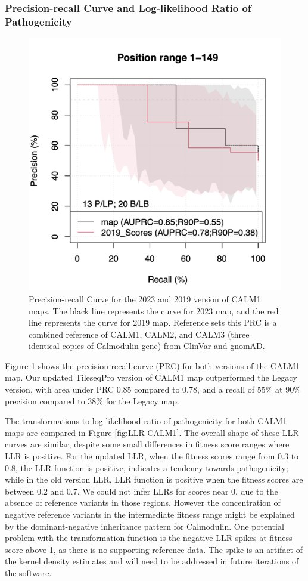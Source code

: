 \documentclass{article}
\begin{document}
\subsubsection{Precision-recall Curve and Log-likelihood Ratio of Pathogenicity}
\begin{figure}[H]
    \centering
    \includegraphics[width =.4\textwidth]{Figures/CALM1/update_PRC.png}
    \caption{Precision-recall Curve for the 2023 and 2019 version of CALM1 maps. The black line represents the curve for 2023 map, and the red line represents the curve for 2019 map. Reference sets this PRC is a combined reference of CALM1, CALM2, and CALM3 (three identical copies of Calmodulin gene) from ClinVar and gnomAD.}
    \label{fig:PRC for CALM1}
\end{figure}

Figure \ref{fig:PRC for CALM1} shows the precision-recall curve (PRC) for both versions of the CALM1 map. Our updated TileseqPro version of CALM1 map outperformed the Legacy version, with area under PRC 0.85 compared to 0.78, and a recall of 55\% at 90\% precision compared to 38\% for the Legacy map.


The transformations to log-likelihood ratio of pathogenicity for both CALM1 maps are compared in Figure \ref{fig:LLR CALM1}. The overall shape of these LLR curves are similar, despite some small differences in fitness score ranges where LLR is positive. For the updated LLR, when the fitness scores range from 0.3 to 0.8, the LLR function is positive, indicates a tendency towards pathogenicity; while in the old version LLR, LLR function is positive when the fitness scores are between 0.2 and 0.7. We could not infer LLRs for scores near 0, due to the absence of reference variants in those regions. However the concentration of negative reference variants in the intermediate fitness range might be explained by the dominant-negative inheritance pattern for Calmodulin\cite{floyd_proactive_2023}.
One potential problem with the transformation function is the negative LLR spikes at fitness score above 1, as there is no supporting reference data. The spike is an artifact of the kernel density estimates and will need to be addressed in future iterations of the software.
\end{document}
